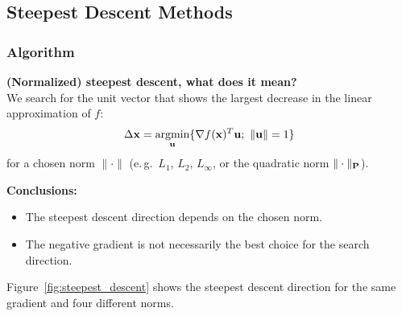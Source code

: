 \subsection{Steepest Descent Methods}

\subsubsection{Algorithm}
\textbf{(Normalized) steepest descent, what does it mean?} \\
We search for the unit vector that shows the largest decrease in the linear approximation of $f$:
\begin{displaymath}
  \Delta \bm{\mathrm{x}} = \operatorname*{argmin}_{\bm{\mathrm{u}}} \{\nabla f(\bm{\mathrm{x}})^T \bm{\mathrm{u}} ; \ \| \bm{\mathrm{u}}\| = 1\}
\end{displaymath}
for a chosen norm $\|\cdot\|$ (e.\,g.\ $L_1$, $L_2$, $L_\infty$, or the quadratic norm $\|\cdot\|_{\mathbf{P}}$).

\textbf{Conclusions:}
  \begin{itemize}
    \item The steepest descent direction depends on the chosen norm.
    \item The negative gradient is not necessarily the best choice for the search direction.
  \end{itemize}
  Figure~\ref{fig:steepest_descent} shows the steepest descent direction for the same gradient and four different norms.

